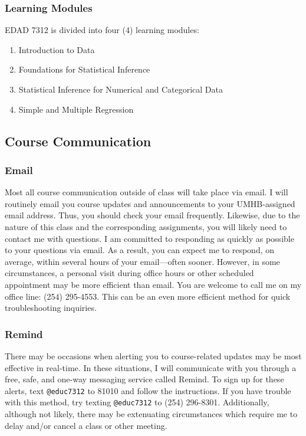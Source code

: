 \documentclass[
]{article}
\providecommand{\tightlist}{%
  \setlength{\itemsep}{0pt}\setlength{\parskip}{0pt}}
\begin{document}
\subsubsection{Learning Modules}

EDAD 7312 is divided into four (4) learning modules:

\begin{enumerate}
\def\labelenumi{\arabic{enumi}.}
\tightlist
\item
  Introduction to Data
\item
  Foundations for Statistical Inference
\item
  Statistical Inference for Numerical and Categorical Data
\item
  Simple and Multiple Regression
\end{enumerate}

\subsection{Course Communication}

\subsubsection{Email}

Most all course communication outside of class will take place via
email. I will routinely email you course updates and announcements to
your UMHB-assigned email address. Thus, you should check your email
frequently. Likewise, due to the nature of this class and the
corresponding assignments, you will likely need to contact me with
questions. I am committed to responding as quickly as possible to your
questions via email. As a result, you can expect me to respond, on
average, within several hours of your email---often sooner. However, in
some circumstances, a personal visit during office hours or other
scheduled appointment may be more efficient than email. You are welcome
to call me on my office line: (254) 295-4553. This can be an even more
efficient method for quick troubleshooting inquiries.

\subsubsection{Remind}

There may be occasions when alerting you to course-related updates may
be most effective in real-time. In these situations, I will communicate
with you through a free, safe, and one-way messaging service called
Remind. To sign up for these alerts, text \texttt{@educ7312} to 81010
and follow the instructions. If you have trouble with this method, try
texting \texttt{@educ7312} to (254) 296-8301. Additionally, although not
likely, there may be extenuating circumstances which require me to delay
and/or cancel a class or other meeting.
\end{document}
